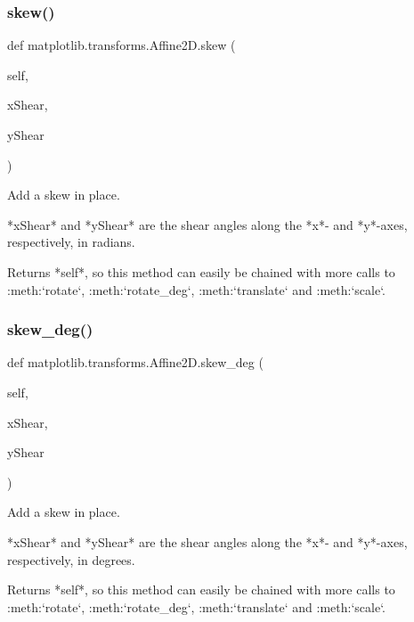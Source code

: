 \subsubsection{\texorpdfstring{skew()}{skew()}}
{\footnotesize\ttfamily def matplotlib.\+transforms.\+Affine2\+D.\+skew (\begin{DoxyParamCaption}\item[{}]{self,  }\item[{}]{x\+Shear,  }\item[{}]{y\+Shear }\end{DoxyParamCaption})}

\begin{DoxyVerb}Add a skew in place.

*xShear* and *yShear* are the shear angles along the *x*- and
*y*-axes, respectively, in radians.

Returns *self*, so this method can easily be chained with more
calls to :meth:`rotate`, :meth:`rotate_deg`, :meth:`translate`
and :meth:`scale`.
\end{DoxyVerb}
 \mbox{\label{classmatplotlib_1_1transforms_1_1Affine2D_afd36d93b4fdbbcdf3b96f265ab6f85a0}} 
\subsubsection{\texorpdfstring{skew\+\_\+deg()}{skew\_deg()}}
{\footnotesize\ttfamily def matplotlib.\+transforms.\+Affine2\+D.\+skew\+\_\+deg (\begin{DoxyParamCaption}\item[{}]{self,  }\item[{}]{x\+Shear,  }\item[{}]{y\+Shear }\end{DoxyParamCaption})}

\begin{DoxyVerb}Add a skew in place.

*xShear* and *yShear* are the shear angles along the *x*- and
*y*-axes, respectively, in degrees.

Returns *self*, so this method can easily be chained with more
calls to :meth:`rotate`, :meth:`rotate_deg`, :meth:`translate`
and :meth:`scale`.
\end{DoxyVerb}
 \mbox{\label{classmatplotlib_1_1transforms_1_1Affine2D_ac0bfbdad7634c5d9ef5c9e479652df39}} 
